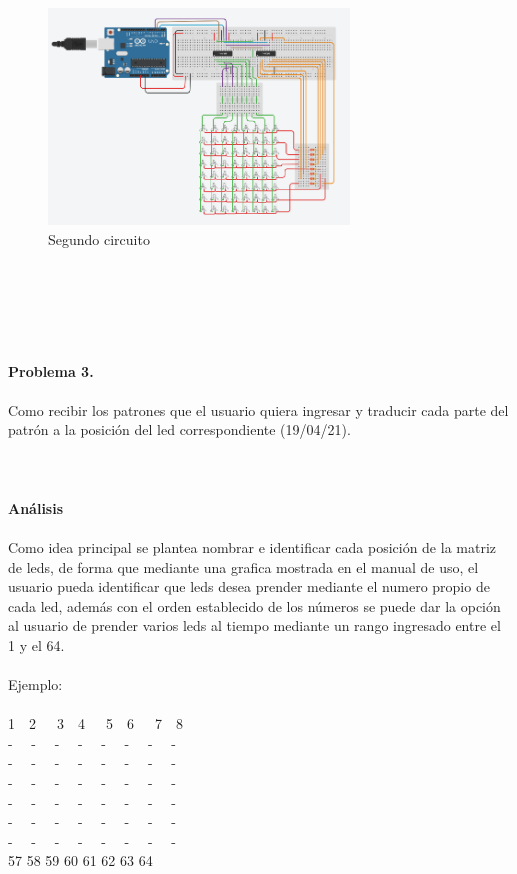 \documentclass{article}
\begin{document}
\begin{figure}[h]
    \includegraphics[width=8cm]{Imagen2.png}
    \centering
    \caption{Segundo circuito}
    \label{fig:Imagen2}
\end{figure}\\\\

\\
\\
\\
\textbf{\large Problema 3.}\\\\
Como recibir los patrones que el usuario quiera ingresar y traducir cada parte del patrón a la posición del led correspondiente (19/04/21).\\
\\\\\
\\

\textbf{\large Análisis}\\\\
Como idea principal se plantea nombrar e identificar cada posición de la matriz de leds, de forma que mediante una grafica mostrada en el manual de uso, el usuario pueda identificar que leds desea prender mediante el numero propio de cada led, además con el orden establecido de los números se puede dar la opción al usuario de prender varios leds al tiempo mediante un rango ingresado entre el 1 y el 64.
\\
\\
Ejemplo:
\\
\\
1\  \ 2\ \ \ 3\  \ 4\ \ \ 5\  \ 6\ \ \ 7\  \ 8\\ 
- \  \  - \  \ - \  \ - \  \ - \  \ - \  \ - \   \ -\\
- \  \  - \  \ - \  \ - \  \ - \  \ - \  \ - \   \ -\\
- \  \  - \  \ - \  \ - \  \ - \  \ - \  \ - \   \ -\\
- \  \  - \  \ - \  \ - \  \ - \  \ - \  \ - \   \ -\\
- \  \  - \  \ - \  \ - \  \ - \  \ - \  \ - \   \ -\\
- \  \  - \  \ - \  \ - \  \ - \  \ - \  \ - \   \ -\\
57 58 59 60 61 62 63 64\\
\end{document}
